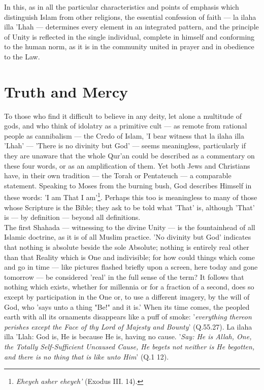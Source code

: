 \documentclass[11pt, b5paper, twoside]{book}
\begin{document}
In this, as in all the particular characteristics and points of emphasis which distinguish Islam from 
other religions, the essential confession of faith --- la ilaha illa 'Lhah --- determines every element 
in an integrated pattern, and the principle of Unity is reflected in the single individual, complete 
in himself and conforming to the human norm, as it is in the community united in prayer and in 
obedience to the Law. \\

\chapter{Truth and Mercy}

To those who find it difficult to believe in any deity, let alone a multitude of gods, and who think 
of idolatry as a primitive cult --- as remote from rational people as cannibalism --- the Credo of Islam, 
'I bear witness that la ilaha illa 'Lhah' --- 'There is no divinity but God' --- seems meaningless, 
particularly if they are unaware that the whole Qur'an could be described as a commentary on these 
four words, or as an amplification of them. Yet both Jews and Christians have, in their own tradition 
--- the Torah or Pentateuch --- a comparable statement. Speaking to Moses from the burning bush, God 
describes Himself in these words: 'I am That I am'\footnote{\emph{Eheyeh asher eheyeh'} (Exodus III. 14).}. Perhaps this too is meaningless to many of those whose Scripture is the Bible; they ask to be told what 'That' is, although 'That' is --- by definition --- beyond all definitions. \\

The first Shahada --- witnessing to the divine Unity --- is the fountainhead of all Islamic doctrine, as 
it is of all Muslim practice. 'No divinity but God' indicates that nothing is absolute beside the 
sole Absolute; nothing is entirely real other than that Reality which is One and indivisible; for how 
could things which come and go in time --- like pictures flashed briefly upon a screen, here today and 
gone tomorrow --- be considered 'real' in the full sense of the term? It follows that nothing which 
exists, whether for millennia or for a fraction of a second, does so except by participation in the 
One or, to use a different imagery, by the will of God, who 'says unto a thing "Be!" and it is.' When 
its time comes, the peopled earth with all its ornaments disappears like a puff of smoke: '\emph{everything thereon perishes except the Face of thy Lord of Majesty and Bounty}' (Q.55.27). La ilaha illa 'Llah: God is, He is because He is, having no cause. '\emph{Say: He is Allah, One, the Totally Self-Sufficient Uncaused Cause, He begets not neither is He begotten, and there is no thing that is like unto Him}' (Q.1 12). \\
\end{document}
